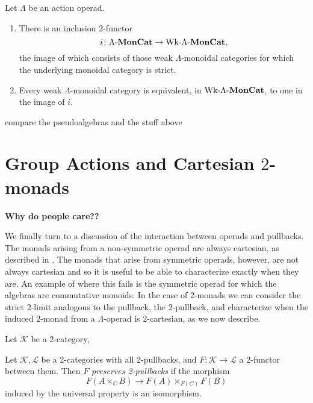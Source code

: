 
\begin{thm}\label{thm:wlmc-to-lmc}
Let $\Lambda$ be an action operad.
\begin{enumerate}
\item There is an inclusion 2-functor
\[
i \colon \Lambda\mbox{-}\mathbf{MonCat} \to \textrm{Wk}\mbox{-}\Lambda\mbox{-}\mathbf{MonCat},
\]
the image of which consists of those weak $\Lambda$-monoidal categories for which the underlying monoidal category is strict.
\item Every weak $\Lambda$-monoidal category is equivalent, in $\textrm{Wk}\mbox{-}\Lambda\mbox{-}\mathbf{MonCat}$, to one in the image of $i$.
\end{enumerate}
\end{thm}

\begin{rem}\label{rem:psELalg-vs-wlmc}
compare the pseudoalgebras and the stuff above
\end{rem}


\section{Group Actions and Cartesian $2$-monads}\label{sec:cart}

\textbf{Why do people care??}


We finally turn to a discussion of the interaction between operads and pullbacks. The monads arising from a non-symmetric operad are always cartesian, as described in \cite{leinster}. The monads that arise from symmetric operads, however, are not always cartesian and so it is useful to be able to characterize exactly when they are. An example of where this fails is the symmetric operad for which the algebras are commutative monoids. In the case of $2$-monads we can consider the  strict $2$-limit analogous to the pullback, the $2$-pullback, and characterize when the induced $2$-monad from a $\Lambda$-operad is $2$-cartesian, as we now describe.

\begin{Defi}[(2-pullback)]\label{Defi:2pb}
Let $\mathcal{K}$ be a 2-category, 
\end{Defi}

\begin{Defi}\label{Defi:pres-2pb}
Let $\mathcal{K}, \mathcal{L}$ be a 2-categories with all 2-pullbacks, and $F \colon \mathcal{K} \to \mathcal{L}$ a 2-functor between them. Then $F$ \emph{preserves 2-pullbacks} if the morphism
\[
F(A \times_C B) \to F(A) \times_{F(C)} F(B)
\]
induced by the universal property is an isomorphism.
\end{Defi}


